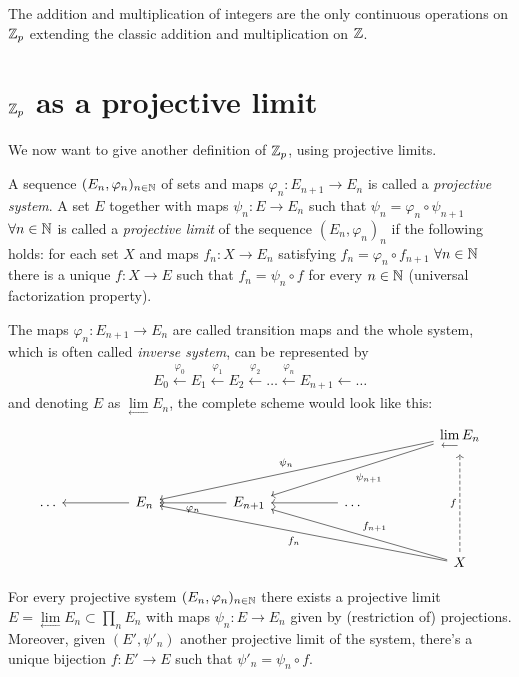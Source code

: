 		\begin{corollary}
			The addition and multiplication of \padic integers are the only continuous operations on $\mathbb{Z}_p$ extending the classic addition and multiplication on $\mathbb{Z}$.
		\end{corollary}
	\section{$\mathbb{Z}_p$ as a projective limit}
		We now want to give another definition of $\mathbb{Z}_p$, using projective limits.
		\begin{defn}
			A sequence $(E_n, \varphi_n)_{n \in \mathbb{N}}$ of sets and maps $\varphi_n\colon E_{n+1} \to E_n$ is called a \textit{projective system}. \newline
			A set $E$ together with maps $\psi_n\colon E \to E_n$ such that $\psi_n = \varphi_n \circ \psi_{n+1}$ $\forall n \in \mathbb{N}$ is called a \textit{projective limit} of the sequence $(E_n, \varphi_n)_n$ if the following holds: for each set $X$ and maps $f_n\colon X \to E_n$ satisfying $f_n = \varphi_n \circ f_{n+1}$ $\forall n \in \mathbb{N}$ there is a unique $f\colon X \to E$ such that $f_n = \psi_n \circ f$ for every $n \in \mathbb{N}$ (universal factorization property).
		\end{defn}
		The maps $\varphi_n\colon E_{n+1} \to E_n$ are called transition maps and the whole system, which is often called \textit{inverse system}, can be represented by
		\begin{gather*}
			E_0 \xleftarrow{\varphi_0} E_1 \xleftarrow{\varphi_1} E_2 \xleftarrow{\varphi_2} \dots \xleftarrow{\varphi_{n}} E_{n+1} \longleftarrow \dots
		\end{gather*}
		and denoting $E$ as $\lim\limits_{\longleftarrow}E_n$, the complete scheme would look like this:
		\begin{equation*}
			\begin{tikzcd}[row sep = large, column sep = huge]
				& & & &  \lim\limits_{\longleftarrow}E_n  \arrow[dlll, "\psi_n"']  \arrow[dll, "\psi_{n+1}"]	\\
				\dots & \arrow[l] E_n & \arrow[l, "\varphi_n"] E_{n+1} & \arrow[l] \dots \\
				 & & & &  X \arrow[ulll, "f_n"]  \arrow[ull, "f_{n+1}"'] \arrow[uu, dashed, "f"]
			\end{tikzcd}
		\end{equation*}
		\begin{thm}
			For every projective system $(E_n, \varphi_n)_{n \in \mathbb{N}}$ there exists a projective limit $E = \lim\limits_{\longleftarrow} E_n \subset \prod_n E_n$ with maps $\psi_n\colon E \to E_n$ given by (restriction of) projections.\newline
			Moreover, given $(E', \psi'_n)$ another projective limit of the system, there's a unique bijection $f\colon E' \to E$ such that $\psi'_n = \psi_n \circ f$.
		\end{thm}
